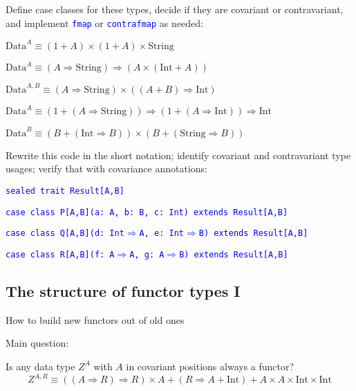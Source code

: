 Define case classes for these types, decide if they are covariant
or contravariant, and implement \texttt{\textcolor{blue}{\footnotesize{}fmap}}
or \texttt{\textcolor{blue}{\footnotesize{}contrafmap}} as needed:

$\text{Data}^{A}\equiv\left(1+A\right)\times\left(1+A\right)\times\text{String}$

$\text{Data}^{A}\equiv\left(A\Rightarrow\text{String}\right)\Rightarrow\left(A\times\left(\text{Int}+A\right)\right)$

$\text{Data}^{A,B}\equiv\left(A\Rightarrow\text{String}\right)\times\left(\left(A+B\right)\Rightarrow\text{Int}\right)$

$\text{Data}^{A}\equiv\left(1+\left(A\Rightarrow\text{String}\right)\right)\Rightarrow\left(1+\left(A\Rightarrow\text{Int}\right)\right)\Rightarrow\text{Int}$

$\text{Data}^{B}\equiv\left(B+\left(\text{Int}\Rightarrow B\right)\right)\times\left(B+\left(\text{String}\Rightarrow B\right)\right)$

Rewrite this code in the short notation; identify covariant and contravariant
type usages; verify that with covariance annotations:

\texttt{\textcolor{blue}{\footnotesize{}sealed trait Result{[}A,B{]}}}{\footnotesize\par}

\texttt{\textcolor{blue}{\footnotesize{}case class P{[}A,B{]}(a: A,
b: B, c: Int)   extends Result{[}A,B{]}}}{\footnotesize\par}

\texttt{\textcolor{blue}{\footnotesize{}case class Q{[}A,B{]}(d: Int$\Rightarrow$A,
e: Int$\Rightarrow$B) extends Result{[}A,B{]}}}{\footnotesize\par}

\texttt{\textcolor{blue}{\footnotesize{}case class R{[}A,B{]}(f: A$\Rightarrow$A,
g: A$\Rightarrow$B)     extends Result{[}A,B{]}}}{\footnotesize\par}


\subsection{The structure of functor types I}

How to build new functors out of old ones

Main question:

Is any data type $Z^{A}$ with $A$ in covariant positions always
a functor? {\footnotesize{}
\[
Z^{A,R}\equiv\left(\left(A\Rightarrow R\right)\Rightarrow R\right)\times A+\left(R\Rightarrow A+\text{Int}\right)+A\times A\times\text{Int}\times\text{Int}
\]
}{\footnotesize\par}

